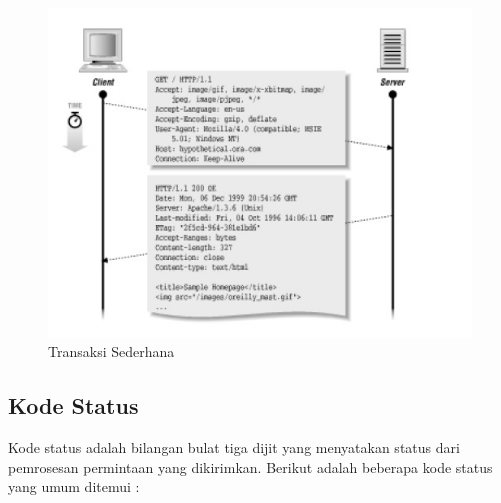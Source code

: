 			\begin{figure}[H]
				\centering		
				\includegraphics[scale=0.6]{Gambar/transaction.jpg}
				\caption[Transaksi sederhana]{Transaksi Sederhana\cite{wong2000http}}
				\label{fig:transaction}	
			\end{figure}

\subsection{Kode Status}
\label{subsec:kodestatus}

Kode status adalah bilangan bulat tiga dijit yang menyatakan status dari pemrosesan permintaan yang dikirimkan. Berikut adalah beberapa kode status yang umum ditemui : 

